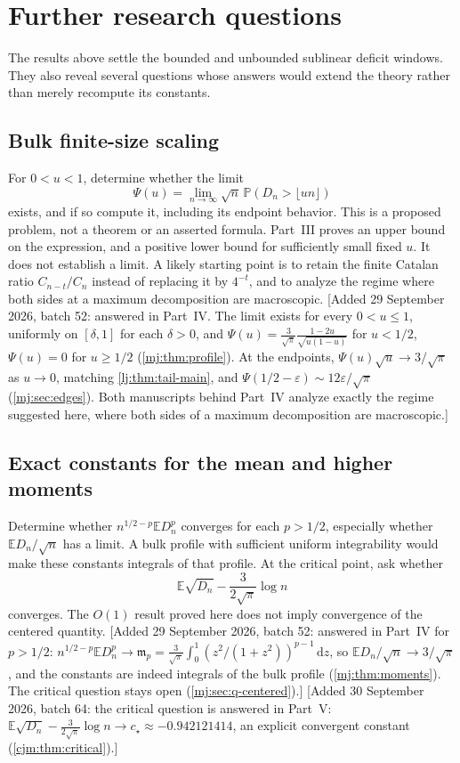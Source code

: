 \documentclass[11pt,a4paper]{article}
\theoremstyle{definition}\newaliascnt{definition}{theorem}
\theoremstyle{remark}\newaliascnt{remark}{theorem}
\newcommand{\dd}{\mathrm d}
\newcommand{\ljP}{\mathbb P}
\newcommand{\ljE}{\mathbb E}
\begin{document}
\section{Further research questions}
\label{lj:sec:questions}
The results above settle the bounded and unbounded sublinear deficit
windows. They also reveal several questions whose answers would extend
the theory rather than merely recompute its constants.

\subsection{Bulk finite-size scaling}
\label{mj:sec:lj-bulk}
For $0<u<1$, determine whether the limit
\begin{equation}
 \Psi(u)=\lim_{n\to\infty}\sqrt n\,\ljP(D_n>\lfloor un\rfloor)
 \label{lj:eq:bulk-question}
\end{equation}
exists, and if so compute it, including its endpoint behavior.
This is a proposed problem, not a theorem or an asserted formula.
Part~III proves an upper bound on the expression, and a positive
lower bound for sufficiently small fixed $u$. It does not establish a
limit. A likely starting point is to retain the finite Catalan ratio
$C_{n-t}/C_n$ instead of replacing it by $4^{-t}$, and to analyze the
regime where both sides at a maximum decomposition are macroscopic.
[Added 29 September 2026, batch 52: answered in Part~IV. The limit exists for
every $0<u\le1$, uniformly on $[\delta,1]$ for each $\delta>0$, and
$\Psi(u)=\frac3{\sqrt\pi}\frac{1-2u}{\sqrt{u(1-u)}}$ for $u<1/2$,
$\Psi(u)=0$ for $u\ge1/2$ (\cref{mj:thm:profile}). At the endpoints,
$\Psi(u)\sqrt u\to3/\sqrt\pi$ as $u\to0$, matching \cref{lj:thm:tail-main},
and $\Psi(1/2-\varepsilon)\sim12\varepsilon/\sqrt\pi$
(\cref{mj:sec:edges}). Both manuscripts behind Part~IV analyze exactly the
regime suggested here, where both sides of a maximum decomposition are
macroscopic.]

\subsection{Exact constants for the mean and higher moments}
\label{mj:sec:lj-moments}
Determine whether
$n^{1/2-p}\ljE D_n^p$ converges for each $p>1/2$, especially whether
$\ljE D_n/\sqrt n$ has a limit. A bulk profile with sufficient uniform
integrability would make these constants integrals of that profile.
At the critical point, ask whether
\[
 \ljE\sqrt{D_n}-\frac3{2\sqrt\pi}\log n
\]
converges. The $O(1)$ result proved here does not imply convergence of
the centered quantity.
[Added 29 September 2026, batch 52: answered in Part~IV for $p>1/2$:
$n^{1/2-p}\ljE D_n^p\to\mathfrak m_p=\frac3{\sqrt\pi}\int_0^1
(z^2/(1+z^2))^{p-1}\,\dd z$, so $\ljE D_n/\sqrt n\to3/\sqrt\pi$, and the
constants are indeed integrals of the bulk profile
(\cref{mj:thm:moments}). The critical question stays open
(\cref{mj:sec:q-centered}).]
[Added 30 September 2026, batch 64: the critical question is answered in
Part~V: $\ljE\sqrt{D_n}-\frac3{2\sqrt\pi}\log n\to c_\star\approx-0.942121414$,
an explicit convergent constant (\cref{cjm:thm:critical}).]
\end{document}

